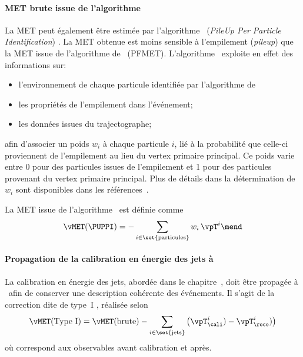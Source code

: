 \paragraph{MET brute issue de l'algorithme \PUPPI}
La MET peut également être estimée par l'algorithme \PUPPI\ (\emph{PileUp Per Particle Identification}) \cite{PUPPI}.
La \og \PUPPI MET \fg{} obtenue est moins sensible à l'empilement (\emph{pileup}) que la MET issue de l'algorithme de \PF\ (PFMET).
L'algorithme \PUPPI\ exploite en effet des informations sur:
\begin{itemize}
\item l'environnement de chaque particule identifiée par l'algorithme de \PF\;
\item les propriétés de l'empilement dans l'événement;
\item les données issues du trajectographe;
\end{itemize}
afin d'associer un poids $w_i$ à chaque particule $i$, lié à la probabilité que celle-ci proviennent de l'empilement au lieu du vertex primaire principal.
Ce poids varie entre
\num{0} pour des particules issues de l'empilement
et
\num{1} pour des particules provenant du vertex primaire principal.
Plus de détails dans la détermination de $w_i$ sont disponibles dans les références~\cite{CMS-PAS-JME-17-001,PUPPI}.
\par La MET issue de l'algorithme \PUPPI\ est définie comme
\begin{equation}
\vMET(\text{\PUPPI}) = -\sum_{i\in\set{\text{particules}}} w_i\,\vpT^{i}
\mend
\end{equation}
\paragraph{Propagation de la calibration en énergie des jets à \MET}
La calibration en énergie des jets, abordée dans le chapitre~, doit être propagée à \MET\ afin de conserver une description cohérente des événements.
Il s'agit de la correction dite de \og type~I \fg{} \cite{CMS_WorkBookMetAnalysis},
réalisée selon
\begin{equation}
\vMET(\text{Type~I}) = \vMET(\text{brute}) - \sum_{i\in\set{\text{jets}}} \left( \vpT^i_\cali) - \vpT^i_\reco) \right)
\end{equation}
où
\og \reco \fg{} correspond aux observables avant calibration
et
\og \cali \fg{} après.